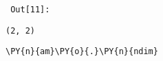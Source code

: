 \par\vspace{1\smallerfontscale}%
    
        {\par%
        \vspace{-1\smallerfontscale}%
        \noindent%
        \begin{minipage}{\cellleftmargin}%
    \hfill%
    {\smaller%
    \tt%
    \color{nbframe-out-prompt}%
    Out[11]:}%
    \hspace{\inputpadding}%
    \hspace{0em}%
    \hspace{3pt}%
    \end{minipage}%
        }%
    \begin{addmargin}[\cellleftmargin]{0em}%
    {\smaller%
    \vspace{-1\smallerfontscale}%
    
    
    
    \begin{verbatim}
(2, 2)
    \end{verbatim}

    
}%
    \end{addmargin}%

{\par%
\vspace{-1\baselineskip}%
}%
\begin{notebookcell}[12]%
\begin{addmargin}[\cellleftmargin]{0em}%
{\smaller%
\par%
%
\vspace{-1\smallerfontscale}%
\begin{Verbatim}[commandchars=\\\{\}]
\PY{n}{am}\PY{o}{.}\PY{n}{ndim}
\end{Verbatim}
%
\par%
\vspace{-1\smallerfontscale}}%
\end{addmargin}
\end{notebookcell}

\par\vspace{1\smallerfontscale}%
    
